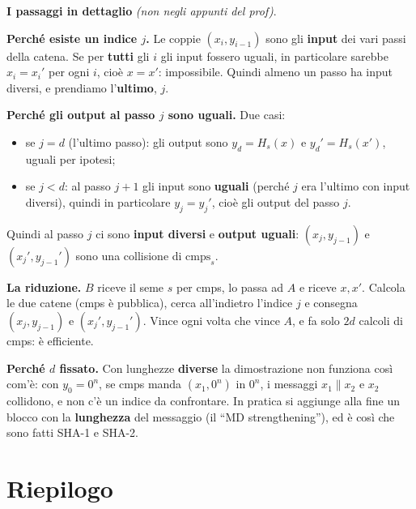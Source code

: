 \begin{nota}
\textbf{I passaggi in dettaglio} \emph{(non negli appunti del prof)}.

\textbf{Perché esiste un indice \(j\).} Le coppie \((x_i, y_{i-1})\) sono gli \textbf{input} dei vari passi della catena. Se per \textbf{tutti} gli \(i\) gli input fossero uguali, in particolare sarebbe \(x_i = x_i'\) per ogni \(i\), cioè \(x = x'\): impossibile. Quindi almeno un passo ha input diversi, e prendiamo l'\textbf{ultimo}, \(j\).

\textbf{Perché gli output al passo \(j\) sono uguali.} Due casi:
\begin{itemize}
  \item se \(j = d\) (l'ultimo passo): gli output sono \(y_d = H_s(x)\) e \(y_d' = H_s(x')\), uguali per ipotesi;
  \item se \(j < d\): al passo \(j + 1\) gli input sono \textbf{uguali} (perché \(j\) era l'ultimo con input diversi), quindi in particolare \(y_j = y_j'\), cioè gli output del passo \(j\).
\end{itemize}
Quindi al passo \(j\) ci sono \textbf{input diversi} e \textbf{output uguali}: \((x_j, y_{j-1})\) e \((x_j', y_{j-1}')\) sono una collisione di \(\text{cmps}_s\).

\textbf{La riduzione.} \(B\) riceve il seme \(s\) per cmps, lo passa ad \(A\) e riceve \(x, x'\). Calcola le due catene (cmps è pubblica), cerca all'indietro l'indice \(j\) e consegna \((x_j, y_{j-1})\) e \((x_j', y_{j-1}')\). Vince ogni volta che vince \(A\), e fa solo \(2d\) calcoli di cmps: è efficiente.

\textbf{Perché \(d\) fissato.} Con lunghezze \textbf{diverse} la dimostrazione non funziona così com'è: con \(y_0 = 0^n\), se cmps manda \((x_1, 0^n)\) in \(0^n\), i messaggi \(x_1 \| x_2\) e \(x_2\) collidono, e non c'è un indice da confrontare. In pratica si aggiunge alla fine un blocco con la \textbf{lunghezza} del messaggio (il ``MD strengthening''), ed è così che sono fatti SHA-1 e SHA-2.
\end{nota}

\section{Riepilogo}

